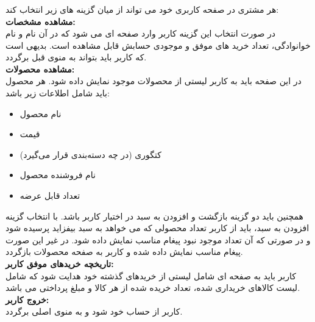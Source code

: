 \documentclass{article}
\begin{document}
    \subsubsection{}
    هر مشتری در صفحه کاربری خود می تواند از میان گزینه های 
    زیر انتخاب کند:
    \vspace{0.5cm}
    \\ \textbf{مشاهده مشخصات:} \\
    در صورت انتخاب این گزینه کاربر وارد صفحه ای می شود 
    که در آن نام و نام خوانوادگی، تعداد خرید های موفق 
    و موجودی حسابش قابل مشاهده است.
    بدیهی است که کاربر باید بتواند به منوی قبل برگردد.
    \vspace{0.5cm}
    \\ \textbf{مشاهده محصولات:} \\
    در این صفحه باید به کاربر لیستی از محصولات موجود نمایش
    داده شود. هر محصول باید شامل اطلاعات زیر باشد:
    \begin{itemize}[label=\textcolor{celestialblue}{\textbullet}]
        \item نام محصول
        \item قیمت
        \item کتگوری (در چه دسته‌بندی قرار می‌گیرد)
        \item نام فروشنده محصول
        \item تعداد قابل عرضه
    \end{itemize}
    همچنین باید دو گزینه بازگشت و افزودن به سبد در اختیار
    کاربر باشد.
    با انتخاب گزینه افزودن به سبد، باید از کاربر تعداد محصولی که می خواهد 
    به سبد بیفزاید پرسیده شود و در صورتی که آن تعداد موجود
    نبود پیغام مناسب نمایش داده شود. در غیر این صورت 
    پیغام مناسب نمایش داده شده و کاربر به صفحه محصولات بازگردد.
    \vspace{0.5cm}
    \\ \textbf{تاریخچه خریدهای موفق کاربر:} \\
    کاربر باید به صفحه ای شامل لیستی از خریدهای گذشته 
    خود هدایت شود که شامل لیست کالاهای خریداری شده، تعداد
    خریده شده از هر کالا و مبلغ پرداختی می باشد.
    \vspace{0.5cm}
    \\ \textbf{خروج کاربر:} \\    
    کاربر از حساب خود 
    شود و به منوی اصلی برگردد.
\end{document}
